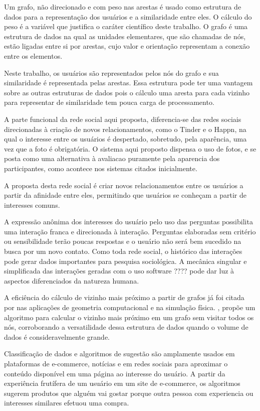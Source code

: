 Um grafo, não direcionado e com peso nas arestas é usado como estrutura de dados para a representação dos usuários e a similaridade entre eles. O cálculo do peso é a variável que justifica o caráter científico deste trabalho. O grafo é uma estrutura de dados na qual as unidades elementares, que são chamadas de nós,  estão ligadas entre si por arestas, cujo valor e orientação representam a conexão entre os elementos.

Neste trabalho, os usuários são representados pelos nós do grafo e sua similaridade é representada pelas arestas. Essa estrutura pode ter uma vantagem sobre as outras estruturas de dados pois o cálculo uma aresta para cada vizinho para representar de similaridade tem pouca carga de processamento.

A parte funcional da rede social aqui proposta, diferencia-se das redes sociais direcionadas à criação de novos relacionamentos, como o Tinder e o Happn, na qual o interesse entre os usuários é despertado, sobretudo, pela aparência, uma vez que a foto é obrigatória. O sistema aqui proposto dispensa o uso de fotos, e se posta como uma alternativa à avaliacao puramente pela aparencia dos participantes, como acontece nos sistemas citados inicialmente.

A proposta desta rede social é criar novos relacionamentos entre os usuários a partir da afinidade entre eles, permitindo que usuários se conheçam a partir de interesses comuns.

A expressão anônima dos interesses do usuário pelo uso das perguntas possibilita uma interação franca e direcionada à interação. Perguntas elaboradas sem critério ou sensibilidade terão poucas respostas e o usuário não será bem sucedido na busca por um novo contato. Como toda rede social, o histórico das interações pode gerar dados importantes para pesquisa sociológica. A mecânica singular e simplificada das interações geradas com o uso software ???? pode dar luz à aspectos diferenciados da natureza humana.

A eficiência do cálculo de vizinho mais próximo a partir de grafos já foi citada por \cite{Paterson1992} nas aplicações de geometria computacional e na simulação física. \cite{Mishra2019}, propõe um algoritmo para calcular o vizinho mais próximo em um grafo sem visitar todos os nós, corroborando a versatilidade dessa estrutura de dados quando o volume de dados é consideravelmente grande.

Classificação de dados e algoritmos de sugestão são amplamente usados em plataformas de e-commerce, notícias e em redes sociais para aproximar o conteúdo disponível em uma página ao interesse do usuário. A partir da experiência frutífera de um usuário em um site de e-commerce, os algoritmos sugerem produtos que alguém vai gostar porque outra pessoa com experiencia ou interesses similares efetuou uma compra.

